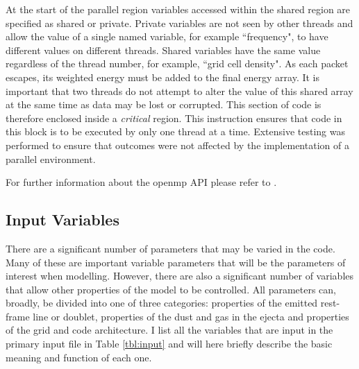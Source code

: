 	At the start of the parallel region variables accessed within the shared region are specified as shared or private.  Private variables are not seen by other threads and allow the value of a single named variable, for example ``frequency", to have different values on different threads.  Shared variables have the same value regardless of the thread number, for example, ``grid cell density".  As each packet escapes, its weighted energy must be added to the final energy array.  It is important that two threads do not attempt to alter the value of this shared array at the same time as data may be lost or corrupted. This section of code is therefore enclosed inside a \textit{critical} region.  This instruction ensures that code in this block is to be executed by only one thread at a time.  Extensive testing was performed to ensure that outcomes were not affected by the implementation of a parallel environment.
	
	For further information about the {\sc openmp} API please refer to \citet{Chapman2007}.
	
	\subsection{Input Variables}
	
	There are a significant number of parameters that may be varied in the code.  Many of these are important variable parameters that will be the parameters of interest when modelling.  However, there are also a significant number of variables that allow other properties of the model to be controlled.  All parameters can, broadly,  be divided into one of three categories:  properties of the emitted rest-frame line or doublet, properties of the dust and gas in the ejecta and properties of the grid and code architecture.  I list all the variables that are input in the primary input file in Table \ref{tbl:input} and will here briefly describe the basic meaning and function of each one.
	
